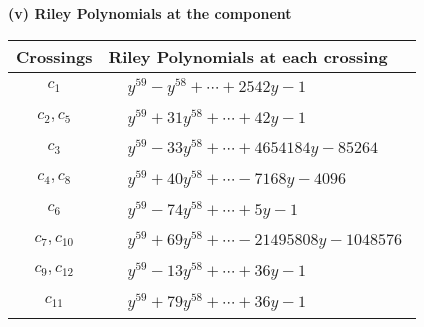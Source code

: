 \documentclass[1p]{elsarticle_modified}
\theoremstyle{definition}
\begin{document}
\newpage\renewcommand{\arraystretch}{1}
\flushleft \textbf{(v) Riley Polynomials at the component}\newline \\
\begin{tabular}{m{50pt}|m{274pt}}
Crossings & \hspace{64pt}Riley Polynomials at each crossing \\
\hline $$\begin{aligned}c_{1}\end{aligned}$$&$\begin{aligned}
&y^{59}- y^{58}+\cdots+2542 y-1
\end{aligned}$\\
\hline $$\begin{aligned}c_{2},c_{5}\end{aligned}$$&$\begin{aligned}
&y^{59}+31 y^{58}+\cdots+42 y-1
\end{aligned}$\\
\hline $$\begin{aligned}c_{3}\end{aligned}$$&$\begin{aligned}
&y^{59}-33 y^{58}+\cdots+4654184 y-85264
\end{aligned}$\\
\hline $$\begin{aligned}c_{4},c_{8}\end{aligned}$$&$\begin{aligned}
&y^{59}+40 y^{58}+\cdots-7168 y-4096
\end{aligned}$\\
\hline $$\begin{aligned}c_{6}\end{aligned}$$&$\begin{aligned}
&y^{59}-74 y^{58}+\cdots+5 y-1
\end{aligned}$\\
\hline $$\begin{aligned}c_{7},c_{10}\end{aligned}$$&$\begin{aligned}
&y^{59}+69 y^{58}+\cdots-21495808 y-1048576
\end{aligned}$\\
\hline $$\begin{aligned}c_{9},c_{12}\end{aligned}$$&$\begin{aligned}
&y^{59}-13 y^{58}+\cdots+36 y-1
\end{aligned}$\\
\hline $$\begin{aligned}c_{11}\end{aligned}$$&$\begin{aligned}
&y^{59}+79 y^{58}+\cdots+36 y-1
\end{aligned}$\\
\hline
\end{tabular}\\~\\
\end{document}
